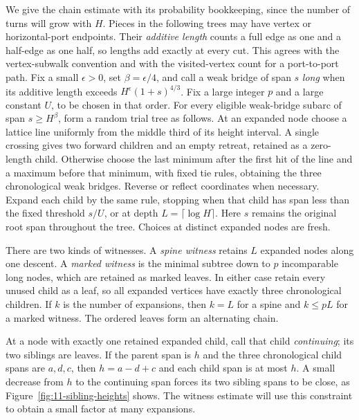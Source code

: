 We give the chain estimate with its probability bookkeeping, since the
number of turns will grow with $H$. Pieces in the following trees may
have vertex or horizontal-port endpoints. Their \emph{additive length}
counts a full edge as one and a half-edge as one half, so lengths add
exactly at every cut. This agrees with the vertex-subwalk convention
and with the visited-vertex count for a port-to-port path.
Fix a small $\epsilon>0$, set
$\beta=\epsilon/4$, and call a weak bridge of span $s$ \emph{long} when
its additive length exceeds $H^\epsilon(1+s)^{4/3}$. Fix a large integer
$p$ and a large constant $U$, to be chosen in that order. For every
eligible weak-bridge subarc of span $s\ge H^\beta$, form a random trial
tree as follows. At an expanded node choose a lattice line uniformly
from the middle third of its height interval. A single crossing gives
two forward children and an empty retreat, retained as a zero-length
child. Otherwise choose the last
minimum after the first hit of the line and a maximum before that
minimum, with fixed tie rules, obtaining the three chronological weak
bridges. Reverse or reflect coordinates when necessary. Expand each
child by the same rule, stopping when that child has span less than
the fixed threshold $s/U$, or at depth $L=\lceil\log H\rceil$.
Here $s$ remains the original root span throughout the tree. Choices
at distinct expanded nodes are fresh.

There are two kinds of witnesses. A \emph{spine witness} retains $L$
expanded nodes along one descent. A \emph{marked witness} is the minimal
subtree down to $p$ incomparable long nodes, which are retained as
marked leaves. In either case retain every unused child as a leaf, so
all expanded vertices have exactly three chronological children. If
$k$ is the number of expansions, then $k=L$ for a spine and $k\le pL$
for a marked witness. The ordered leaves form an alternating chain.

At a node with exactly one retained expanded child, call that child
\emph{continuing}; its two siblings are leaves. If the parent span is
$h$ and the three chronological child spans are $a,d,c$, then
$h=a-d+c$ and each child span is at most $h$. A small decrease from
$h$ to the continuing span forces its two sibling spans to be close,
as Figure~\ref{fig:11-sibling-heights} shows. The witness estimate will
use this constraint to obtain a small factor at many expansions.

